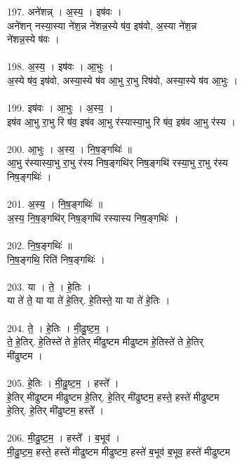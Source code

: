 \subsubsection{}
197. अने॑शन्न् । अ॒स्य॒ । इष॑वः ।\\
अने॑शन् नस्या॒स्या ने॑श॒न्न ने॑शन्न॒स्ये ष॑व॒ इष॑वो, अ॒स्या ने॑श॒न्न\\
ने॑शन्न॒स्ये ष॑वः ।\\
\\
198. अ॒स्य॒ । इष॑वः । आ॒भुः ।\\
अ॒स्ये ष॑व॒ इष॑वो, अस्या॒स्ये ष॑व आ॒भु रा॒भु रिष॑वो, अस्या॒स्ये ष॑व आ॒भुः ।\\
\\
199. इष॑वः । आ॒भुः । अ॒स्य॒ ।\\
इष॑व आ॒भु रा॒भु रि ष॑व॒ इष॑व आ॒भु र॑स्यास्या॒भु रि ष॑व॒ इष॑व आ॒भु र॑स्य ।\\
\\
200. आ॒भुः । अ॒स्य॒ । नि॒ष॒ङ्गथिः॑ ॥\\
आ॒भु र॑स्यास्या॒भु रा॒भु र॑स्य निष॒ङ्गथि॑र् निष॒ङ्गथि॑ रस्या॒भु रा॒भु र॑स्य\\
निष॒ङ्गथिः॑ ।\\
\\
201. अ॒स्य॒ । नि॒ष॒ङ्गथिः॑ ॥\\
अ॒स्य॒ नि॒ष॒ङ्गथि॑र् निष॒ङ्गथि॑ रस्यास्य निष॒ङ्गथिः॑ ।\\
\\
202. नि॒ष॒ङ्गथिः॑ ॥\\
नि॒ष॒ङ्गथि॒ रिति॑ निष॒ङ्गथिः॑ ।\\
\\
203. या । ते॒ । हे॒तिः ।\\
या ते॑ ते॒ या या ते॑ हे॒तिर्. हे॒तिस्ते॒ या या ते॑ हे॒तिः ।\\
\\
204. ते॒ । हे॒तिः । मी॒ढु॒ष्ट॒म॒ ।\\
ते॒ हे॒तिर्. हे॒तिस्ते॑ ते हे॒तिर् मी॑ढुष्टम मीढुष्टम हे॒तिस्ते॑ ते हे॒तिर्\\
मी॑ढुष्टम ।\\
\\
205. हे॒तिः । मी॒ढु॒ष्ट॒म॒ । हस्ते᳚ ।\\
हे॒तिर् मी॑ढुष्टम मीढुष्टम हे॒तिर्. हे॒तिर् मी॑ढुष्टम॒ हस्ते॒ हस्ते॑ मीढुष्टम\\
हे॒तिर्. हे॒तिर् मी॑ढुष्टम॒ हस्ते᳚ ।\\
\\
206. मी॒ढु॒ष्ट॒म॒ । हस्ते᳚ । ब॒भूव॑ ।\\
मी॒ढु॒ष्ट॒म॒ हस्ते॒ हस्ते॑ मीढुष्टम मीढुष्टम॒ हस्ते॑ ब॒भूव॑ ब॒भूव॒ हस्ते॑ मीढुष्टम\\
